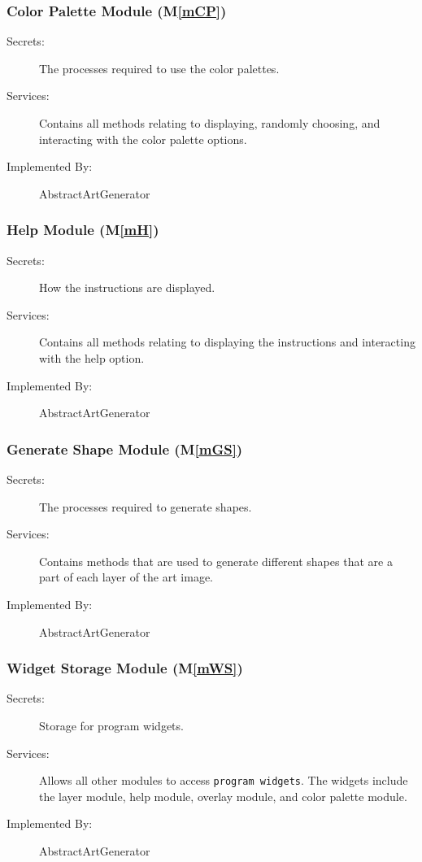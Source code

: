 \documentclass[12pt, titlepage]{article}
\newcommand{\mref}[1]{M\ref{#1}}
\begin{document}
\subsubsection{Color Palette Module (\mref{mCP})}

\begin{description}
\item[Secrets:] The processes required to use the color palettes.
\item[Services:] Contains all methods relating to displaying, randomly choosing, and interacting with the color palette options.
\item[Implemented By:] AbstractArtGenerator
\end{description}

\subsubsection{Help Module (\mref{mH})}

\begin{description}
\item[Secrets:] How the instructions are displayed.
\item[Services:] Contains all methods relating to displaying the instructions and interacting with the help option.
\item[Implemented By:] AbstractArtGenerator
\end{description}

\subsubsection{Generate Shape Module (\mref{mGS})}

\begin{description}
\item[Secrets:] The processes required to generate shapes.
\item[Services:] Contains methods that are used to generate different shapes that are a part of each layer of the art image.
\item[Implemented By:] AbstractArtGenerator
\end{description}

\subsubsection{Widget Storage Module (\mref{mWS})}

\begin{description}
\item[Secrets:] Storage for program widgets.
\item[Services:] Allows all other modules to access \texttt{program widgets}. The widgets include the layer module, help module, overlay module, and color palette module.
\item[Implemented By:] AbstractArtGenerator
\end{description}
\end{document}
